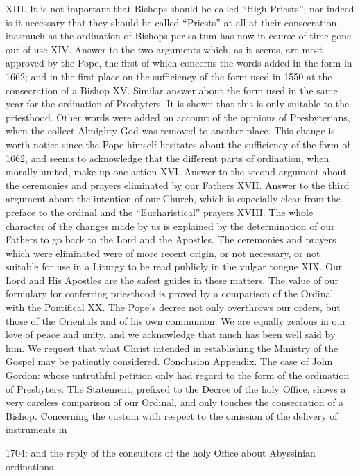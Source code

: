 XIII. It is not important that Bishops should be called “High Priests”; nor indeed is it necessary that they should be called “Priests” at all at their consecration, inasmuch as the ordination of Bishops per saltum has now in course of time gone out of use XIV. Answer to the two arguments which, as it seems, are most approved by the Pope, the first of which concerns the words added in the form in 1662; and in the first place on the sufficiency of the form used in 1550 at the consecration of a Bishop XV. Similar answer about the form used in the same year for the ordination of Presbyters. It is shown that this is only suitable to the priesthood. Other words were added on account of the opinions of Presbyterians, when the collect Almighty God was removed to another place. This change is worth notice since the Pope himself hesitates about the sufficiency of the form of 1662, and seems to acknowledge that the different parts of ordination, when morally united, make up one action XVI. Answer to the second argument about the ceremonies and prayers eliminated by our Fathers XVII. Answer to the third argument about the intention of our Church, which is especially clear from the preface to the ordinal and the “Eucharistical” prayers XVIII. The whole character of the changes made by us is explained by the determination of our Fathers to go back to the Lord and the Apostles. The ceremonies and prayers which were eliminated were of more recent origin, or not necessary, or not suitable for use in a Liturgy to be read publicly in the vulgar tongue XIX. Our Lord and His Apostles are the safest guides in these matters. The value of our formulary for conferring priesthood is proved by a comparison of the Ordinal with the Pontifical XX. The Pope’s decree not only overthrows our orders, but those of the Orientals and of his own communion. We are equally zealous in our love of peace and unity, and we acknowledge that much has been well said by him. We request that what Christ intended in establishing the Ministry of the Gospel may be patiently considered. Conclusion Appendix. The case of John Gordon: whose untruthful petition only had regard to the form of the ordination of Presbyters. The Statement, prefixed to the Decree of the holy Office, shows a very careless comparison of our Ordinal, and only touches the consecration of a Bishop. Concerning the custom with respect to the omission of the delivery of instruments in

1704: and the reply of the consultors of the holy Office about Abyssinian ordinations

